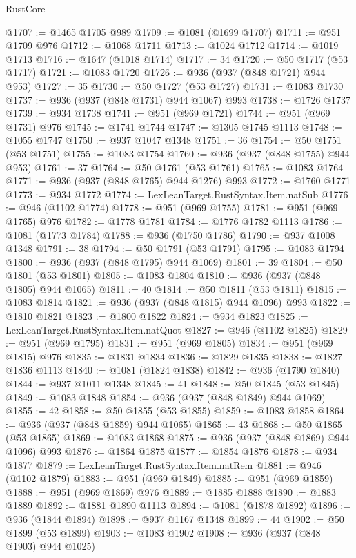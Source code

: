 \begin{lexlean}{RustCore}
\begin{coremodule}
@1707 := @1465 @1705 @989
@1709 := @1081 (@1699 @1707)
@1711 := @951 @1709 @976
@1712 := @1068 @1711
@1713 := @1024 @1712
@1714 := @1019 @1713
@1716 := @1647 (@1018 @1714)
@1717 := 34
@1720 := @50 @1717 (@53 @1717)
@1721 := @1083 @1720
@1726 := @936 (@937 (@848 @1721) @944 @953)
@1727 := 35
@1730 := @50 @1727 (@53 @1727)
@1731 := @1083 @1730
@1737 := @936 (@937 (@848 @1731) @944 @1067) @993
@1738 := @1726 @1737
@1739 := @934 @1738
@1741 := @951 (@969 @1721)
@1744 := @951 (@969 @1731) @976
@1745 := @1741 @1744
@1747 := @1305 @1745 @1113
@1748 := @1055 @1747
@1750 := @937 @1047 @1348
@1751 := 36
@1754 := @50 @1751 (@53 @1751)
@1755 := @1083 @1754
@1760 := @936 (@937 (@848 @1755) @944 @953)
@1761 := 37
@1764 := @50 @1761 (@53 @1761)
@1765 := @1083 @1764
@1771 := @936 (@937 (@848 @1765) @944 @1276) @993
@1772 := @1760 @1771
@1773 := @934 @1772
@1774 := LexLeanTarget.RustSyntax.Item.natSub
@1776 := @946 (@1102 @1774)
@1778 := @951 (@969 @1755)
@1781 := @951 (@969 @1765) @976
@1782 := @1778 @1781
@1784 := @1776 @1782 @1113
@1786 := @1081 (@1773 @1784)
@1788 := @936 (@1750 @1786)
@1790 := @937 @1008 @1348
@1791 := 38
@1794 := @50 @1791 (@53 @1791)
@1795 := @1083 @1794
@1800 := @936 (@937 (@848 @1795) @944 @1069)
@1801 := 39
@1804 := @50 @1801 (@53 @1801)
@1805 := @1083 @1804
@1810 := @936 (@937 (@848 @1805) @944 @1065)
@1811 := 40
@1814 := @50 @1811 (@53 @1811)
@1815 := @1083 @1814
@1821 := @936 (@937 (@848 @1815) @944 @1096) @993
@1822 := @1810 @1821
@1823 := @1800 @1822
@1824 := @934 @1823
@1825 := LexLeanTarget.RustSyntax.Item.natQuot
@1827 := @946 (@1102 @1825)
@1829 := @951 (@969 @1795)
@1831 := @951 (@969 @1805)
@1834 := @951 (@969 @1815) @976
@1835 := @1831 @1834
@1836 := @1829 @1835
@1838 := @1827 @1836 @1113
@1840 := @1081 (@1824 @1838)
@1842 := @936 (@1790 @1840)
@1844 := @937 @1011 @1348
@1845 := 41
@1848 := @50 @1845 (@53 @1845)
@1849 := @1083 @1848
@1854 := @936 (@937 (@848 @1849) @944 @1069)
@1855 := 42
@1858 := @50 @1855 (@53 @1855)
@1859 := @1083 @1858
@1864 := @936 (@937 (@848 @1859) @944 @1065)
@1865 := 43
@1868 := @50 @1865 (@53 @1865)
@1869 := @1083 @1868
@1875 := @936 (@937 (@848 @1869) @944 @1096) @993
@1876 := @1864 @1875
@1877 := @1854 @1876
@1878 := @934 @1877
@1879 := LexLeanTarget.RustSyntax.Item.natRem
@1881 := @946 (@1102 @1879)
@1883 := @951 (@969 @1849)
@1885 := @951 (@969 @1859)
@1888 := @951 (@969 @1869) @976
@1889 := @1885 @1888
@1890 := @1883 @1889
@1892 := @1881 @1890 @1113
@1894 := @1081 (@1878 @1892)
@1896 := @936 (@1844 @1894)
@1898 := @937 @1167 @1348
@1899 := 44
@1902 := @50 @1899 (@53 @1899)
@1903 := @1083 @1902
@1908 := @936 (@937 (@848 @1903) @944 @1025)

\end{coremodule}
\end{lexlean}
